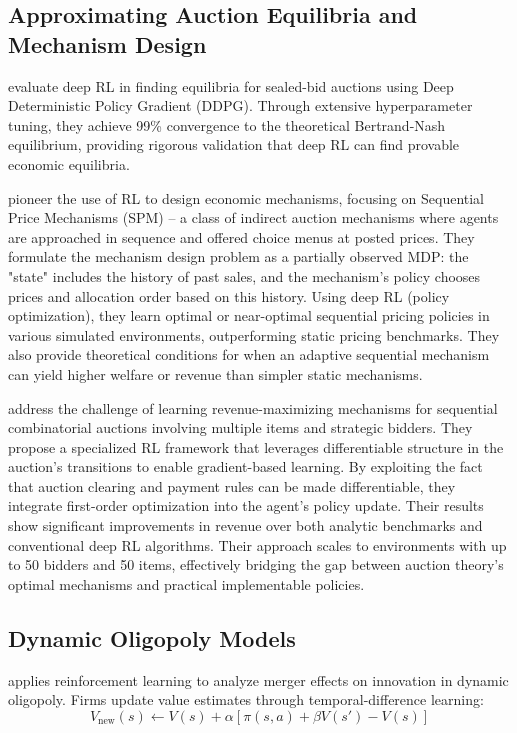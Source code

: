 \subsection{Approximating Auction Equilibria and Mechanism Design}

\citet{GrafEtAl2024} evaluate deep RL in finding equilibria for sealed-bid auctions using Deep Deterministic Policy Gradient (DDPG). Through extensive hyperparameter tuning, they achieve 99\% convergence to the theoretical Bertrand-Nash equilibrium, providing rigorous validation that deep RL can find provable economic equilibria.

\citet{BreroEtAl2021} pioneer the use of RL to design economic mechanisms, focusing on Sequential Price Mechanisms (SPM) – a class of indirect auction mechanisms where agents are approached in sequence and offered choice menus at posted prices. They formulate the mechanism design problem as a partially observed MDP: the "state" includes the history of past sales, and the mechanism's policy chooses prices and allocation order based on this history. Using deep RL (policy optimization), they learn optimal or near-optimal sequential pricing policies in various simulated environments, outperforming static pricing benchmarks. They also provide theoretical conditions for when an adaptive sequential mechanism can yield higher welfare or revenue than simpler static mechanisms.

\citet{RavindranathEtAl2024} address the challenge of learning revenue-maximizing mechanisms for sequential combinatorial auctions involving multiple items and strategic bidders. They propose a specialized RL framework that leverages differentiable structure in the auction's transitions to enable gradient-based learning. By exploiting the fact that auction clearing and payment rules can be made differentiable, they integrate first-order optimization into the agent's policy update. Their results show significant improvements in revenue over both analytic benchmarks and conventional deep RL algorithms. Their approach scales to environments with up to 50 bidders and 50 items, effectively bridging the gap between auction theory's optimal mechanisms and practical implementable policies.

\subsection{Dynamic Oligopoly Models}

\citet{Hollenbeck2019} applies reinforcement learning to analyze merger effects on innovation in dynamic oligopoly. Firms update value estimates through temporal-difference learning:
\begin{equation}
V_{\text{new}}(s) \leftarrow V(s) + \alpha[\pi(s,a) + \beta V(s') - V(s)]
\end{equation}

